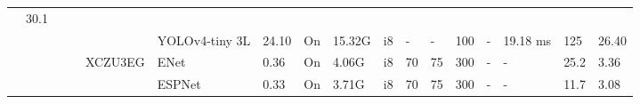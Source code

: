 \documentclass{article}
\begin{document}
\begin{table}
\begin{adjustbox}{totalheight=\baselineskip,}
\begin{tabular}{ccccclp{2em}cp{3em}cp{2em}p{4em}p{3em}p{3.5em}p{3.5em}p{2.5em}p{3em}}
                                                               &\multirow{1}{*}{30.1}\\
   &   &   &   &   &\multirow{1}{*}{YOLOv4-tiny 3L}
                       &\multirow{1}{*}{24.10}
                           &\multirow{1}{*}{On}
                               &\multirow{1}{*}{15.32G}
                                   &\multirow{1}{*}{i8}
                                       &\multirow{1}{*}{-}
                                           &\multirow{1}{*}{-}
                                               &\multirow{1}{*}{100}
                                                   &\multirow{1}{*}{-}
                                                       &\multirow{1}{*}{19.18 ms}
                                                           &\multirow{1}{*}{125}
                                                               &\multirow{1}{*}{26.40}\\
\cmidrule{4-17}
   &   &   &\multirow{4}{*}{\cite{sabogalMethodologyEvaluatingAnalyzing2021a}}
               &\multirow{4}{*}{XCZU3EG}
                   &\multirow{1}{*}{ENet}
                       &\multirow{1}{*}{0.36}
                           &\multirow{1}{*}{On}
                               &\multirow{1}{*}{4.06G}
                                   &\multirow{1}{*}{i8}
                                       &\multirow{1}{*}{70}
                                           &\multirow{1}{*}{75}
                                               &\multirow{1}{*}{300}
                                                   &\multirow{1}{*}{-}
                                                       &\multirow{1}{*}{-}
                                                           &\multirow{1}{*}{25.2}
                                                               &\multirow{1}{*}{3.36}\\
   &   &   &   &   &\multirow{1}{*}{ESPNet}
                       &\multirow{1}{*}{0.33}
                           &\multirow{1}{*}{On}
                               &\multirow{1}{*}{3.71G}
                                   &\multirow{1}{*}{i8}
                                       &\multirow{1}{*}{70}
                                           &\multirow{1}{*}{75}
                                               &\multirow{1}{*}{300}
                                                   &\multirow{1}{*}{-}
                                                       &\multirow{1}{*}{-}
                                                           &\multirow{1}{*}{11.7}
                                                               &\multirow{1}{*}{3.08}\\

\end{tabular}
\end{adjustbox}
\end{table}
\end{document}
